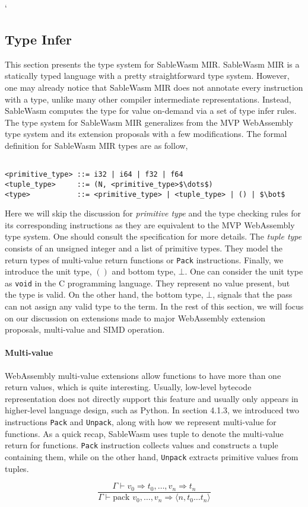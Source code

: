 `\subsection{Type Infer}

This section presents the type system for SableWasm MIR. SableWasm MIR is a statically typed language with a pretty straightforward type system. However, one may already notice that SableWasm MIR does not annotate every instruction with a type, unlike many other compiler intermediate representations. Instead, SableWasm computes the type for value on-demand via a set of type infer rules. The type system for SableWasm MIR generalizes from the MVP WebAssembly type system and its extension proposals with a few modifications. The formal definition for SableWasm MIR types are as follow,

\begin{lstlisting}[basicstyle=\linespread{1}\ttfamily, mathescape=true]

<primitive_type> ::= i32 | i64 | f32 | f64 
<tuple_type>     ::= (N, <primitive_type>$\dots$)
<type>           ::= <primitive_type> | <tuple_type> | () | $\bot$

\end{lstlisting}

Here we will skip the discussion for \emph{primitive type} and the type checking rules for its corresponding instructions as they are equivalent to the MVP WebAssembly type system. One should consult the specification for more details. The \emph{tuple type} consists of an unsigned integer and a list of primitive types. They model the return types of multi-value return functions or \texttt{Pack} instructions. Finally, we introduce the unit type, $()$ and bottom type, $\bot$. One can consider the unit type as \texttt{void} in the C programming language. They represent no value present, but the type is valid. On the other hand, the bottom type, $\bot$, signals that the pass can not assign any valid type to the term. In the rest of this section, we will focus on our discussion on extensions made to major WebAssembly extension proposals, multi-value and SIMD operation.

\paragraph{Multi-value} WebAssembly multi-value extensions allow functions to have more than one return values, which is quite interesting. Usually, low-level bytecode representation does not directly support this feature and usually only appears in higher-level language design, such as Python. In section 4.1.3, we introduced two instructions \texttt{Pack} and \texttt{Unpack}, along with how we represent multi-value for functions. As a quick recap, SableWasm uses tuple to denote the multi-value return for functions. \texttt{Pack} instruction collects values and constructs a tuple containing them, while on the other hand, \texttt{Unpack} extracts primitive values from tuples.

$$
    \frac{\Gamma \vdash v_0 \Rightarrow t_0, \dots, v_n \Rightarrow t_n}{\Gamma \vdash \text{pack } v_0, \dots, v_n \Rightarrow \langle n, t_0 \dots t_n \rangle}
$$
